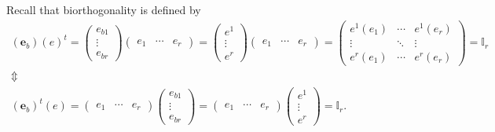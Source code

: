 \documentclass[aps,preprint]{revtex4}
\begin{document}
Recall that biorthogonality is defined by 
\begin{gather}
\left( \boldsymbol{e}_{b}\right) \left( e\right) ^{t}=\left( 
\begin{array}{c}
e_{b1} \\ 
\vdots \\ 
e_{br}%
\end{array}%
\right) \left( 
\begin{array}{ccc}
e_{1} & \cdots & e_{r}%
\end{array}%
\right) =\left( 
\begin{array}{c}
e^{1} \\ 
\vdots \\ 
e^{r}%
\end{array}%
\right) \left( 
\begin{array}{ccc}
e_{1} & \cdots & e_{r}%
\end{array}%
\right) =\left( 
\begin{array}{ccc}
e^{1}\left( e_{1}\right) & \cdots & e^{1}\left( e_{r}\right) \\ 
\vdots & \ddots & \vdots \\ 
e^{r}\left( e_{1}\right) & \cdots & e^{r}\left( e_{r}\right)%
\end{array}%
\right) =\mathbb{I}_{r} \\
\Updownarrow \\
\left( \boldsymbol{e}_{b}\right) ^{t}\left( e\right) =\left( 
\begin{array}{ccc}
e_{1} & \cdots & e_{r}%
\end{array}%
\right) \left( 
\begin{array}{c}
e_{b1} \\ 
\vdots \\ 
e_{br}%
\end{array}%
\right) =\left( 
\begin{array}{ccc}
e_{1} & \cdots & e_{r}%
\end{array}%
\right) \left( 
\begin{array}{c}
e^{1} \\ 
\vdots \\ 
e^{r}%
\end{array}%
\right) =\mathbb{I}_{r}.
\end{gather}
\end{document}
